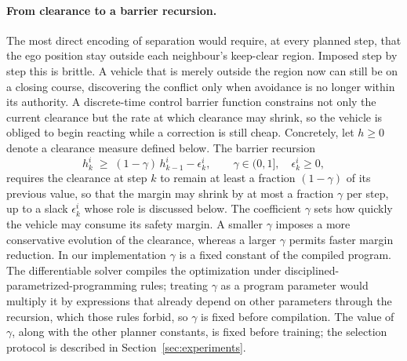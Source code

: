 \documentclass[11pt]{article}
\theoremstyle{plain}
\theoremstyle{definition}
\begin{document}
\paragraph{From clearance to a barrier recursion.}
The most direct encoding of separation would require, at every
planned step, that the ego position stay outside each neighbour's
keep-clear region. Imposed step by step this is brittle. A vehicle
that is merely outside the region now can still be on a closing
course, discovering the conflict only when avoidance is no longer
within its authority. A discrete-time control barrier function
constrains not only the current clearance but the rate at which
clearance may shrink, so the vehicle is obliged to begin reacting
while a correction is still cheap. Concretely, let $h \geq 0$ denote a
clearance measure defined below. The barrier recursion
\begin{equation}
	\label{eq:cbf-condition}
	h^{i}_{k} \;\geq\; (1 - \gamma)\, h^{i}_{k-1} - \epsilon^{i}_{k},
	\qquad \gamma \in (0, 1],\quad \epsilon^{i}_{k} \geq 0,
\end{equation}
requires the clearance at step $k$ to remain at least a fraction
$(1-\gamma)$ of its previous value, so that the margin may shrink by
at most a fraction $\gamma$ per step, up to a slack $\epsilon^i_k$
whose role is discussed below. The coefficient $\gamma$ sets how quickly the
vehicle may consume its safety margin. A smaller $\gamma$ imposes a
more conservative evolution of the clearance, whereas a larger
$\gamma$ permits faster margin reduction. In our implementation
$\gamma$ is a fixed constant of the compiled program. The
differentiable solver compiles the optimization under
disciplined-parametrized-programming rules; treating $\gamma$ as a
program parameter would multiply it by expressions that already depend
on other parameters through the recursion, which those rules forbid,
so $\gamma$ is fixed before compilation. The value of $\gamma$, along
with the other planner constants, is fixed before training; the
selection protocol is described in Section~\ref{sec:experiments}.
 
\end{document}
